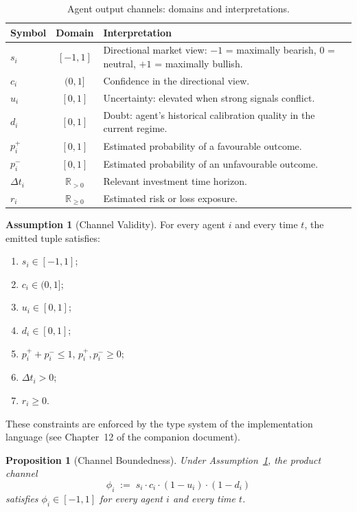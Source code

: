\documentclass[12pt,openany]{book}
\numberwithin{equation}{chapter}
\theoremstyle{plain}
\newtheorem{proposition}[theorem]{Proposition}
\theoremstyle{definition}
\newtheorem{assumption}[theorem]{Assumption}
\theoremstyle{remark}
\numberwithin{equation}{chapter}
\theoremstyle{plain}
\begin{document}
\begin{table}[H]
\centering
\caption{Agent output channels: domains and interpretations.}
\label{tab:agent-channels}
\small
\begin{tabularx}{\linewidth}{@{} l c X @{}}
\toprule
\textbf{Symbol} & \textbf{Domain} & \textbf{Interpretation} \\
\midrule
$s_i$ & $[-1,1]$ & Directional market view: $-1$ = maximally bearish,
  $0$ = neutral, $+1$ = maximally bullish. \\
$c_i$ & $(0,1]$ & Confidence in the directional view. \\
$u_i$ & $[0,1]$ & Uncertainty: elevated when strong signals conflict. \\
$d_i$ & $[0,1]$ & Doubt: agent's historical calibration quality in the
  current regime. \\
$p_i^+$ & $[0,1]$ & Estimated probability of a favourable outcome. \\
$p_i^-$ & $[0,1]$ & Estimated probability of an unfavourable outcome. \\
$\Delta t_i$ & $\mathbb{R}_{>0}$ & Relevant investment time horizon. \\
$r_i$ & $\mathbb{R}_{\geq 0}$ & Estimated risk or loss exposure. \\
\bottomrule
\end{tabularx}
\end{table}

\begin{assumption}[Channel Validity]
\label{asm:channel-validity}
For every agent $i$ and every time $t$, the emitted tuple satisfies:
\begin{enumerate}[label=\textbf{(CV\arabic*)}]
  \item $s_i \in [-1,1]$;
  \item $c_i \in (0,1]$;
  \item $u_i \in [0,1]$;
  \item $d_i \in [0,1]$;
  \item $p_i^+ + p_i^- \leq 1$, $p_i^+, p_i^- \geq 0$;
  \item $\Delta t_i > 0$;
  \item $r_i \geq 0$.
\end{enumerate}
These constraints are enforced by the type system of the
implementation language (see Chapter~12 of the companion document).
\end{assumption}

\begin{proposition}[Channel Boundedness]
\label{prop:channel-bounded}
Under Assumption~\ref{asm:channel-validity}, the product channel
\begin{equation}
  \phi_i \;:=\; s_i \cdot c_i \cdot (1 - u_i) \cdot (1 - d_i)
  \label{eq:phi-channel}
\end{equation}
satisfies $\phi_i \in [-1,1]$ for every agent $i$ and every time $t$.
\end{proposition}
\end{document}
